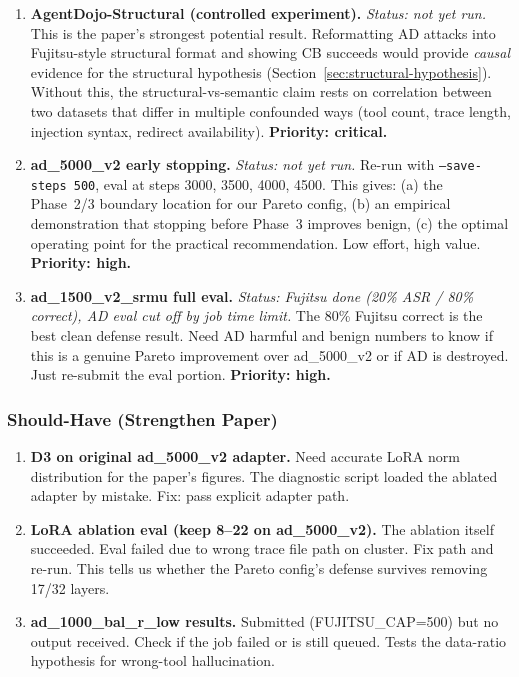 \documentclass[11pt]{article}
\begin{document}
\begin{enumerate}
  \item \textbf{AgentDojo-Structural (controlled experiment).}
        \emph{Status: not yet run.}
        This is the paper's strongest potential result.  Reformatting AD
        attacks into Fujitsu-style structural format and showing CB
        succeeds would provide \emph{causal} evidence for the structural
        hypothesis (Section~\ref{sec:structural-hypothesis}).  Without
        this, the structural-vs-semantic claim rests on correlation between
        two datasets that differ in multiple confounded ways (tool count,
        trace length, injection syntax, redirect availability).
        \textbf{Priority: critical.}

  \item \textbf{ad\_5000\_v2 early stopping.}
        \emph{Status: not yet run.}
        Re-run with \texttt{--save-steps 500}, eval at steps 3000, 3500,
        4000, 4500.  This gives: (a) the Phase~2/3 boundary location for
        our Pareto config, (b) an empirical demonstration that stopping
        before Phase~3 improves benign, (c) the optimal operating point
        for the practical recommendation.  Low effort, high value.
        \textbf{Priority: high.}

  \item \textbf{ad\_1500\_v2\_srmu full eval.}
        \emph{Status: Fujitsu done (20\% ASR / 80\% correct), AD eval
        cut off by job time limit.}
        The 80\% Fujitsu correct is the best clean defense result.  Need
        AD harmful and benign numbers to know if this is a genuine
        Pareto improvement over ad\_5000\_v2 or if AD is destroyed.
        Just re-submit the eval portion.
        \textbf{Priority: high.}
\end{enumerate}

\subsubsection{Should-Have (Strengthen Paper)}

\begin{enumerate}
  \item \textbf{D3 on original ad\_5000\_v2 adapter.}
        Need accurate LoRA norm distribution for the paper's figures.
        The diagnostic script loaded the ablated adapter by mistake.
        Fix: pass explicit adapter path.

  \item \textbf{LoRA ablation eval (keep 8--22 on ad\_5000\_v2).}
        The ablation itself succeeded.  Eval failed due to wrong trace
        file path on cluster.  Fix path and re-run.  This tells us
        whether the Pareto config's defense survives removing 17/32 layers.

  \item \textbf{ad\_1000\_bal\_r\_low results.}
        Submitted (FUJITSU\_CAP=500) but no output received.  Check
        if the job failed or is still queued.  Tests the data-ratio
        hypothesis for wrong-tool hallucination.
\end{enumerate}
\end{document}
